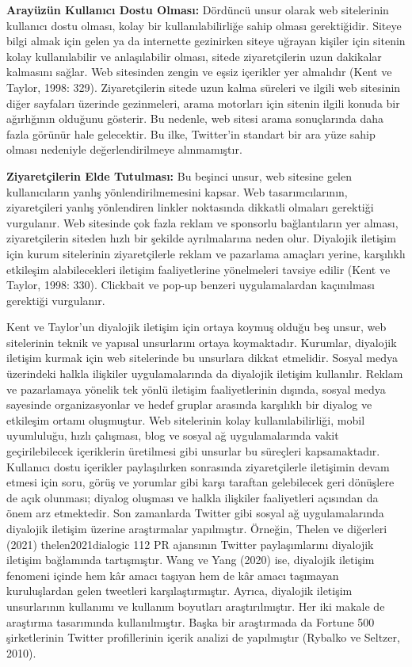 \documentclass[
]{book}
\begin{document}
\textbf{Arayüzün Kullanıcı Dostu Olması:} Dördüncü unsur olarak web sitelerinin kullanıcı dostu olması, kolay bir kullanılabilirliğe sahip olması gerektiğidir. Siteye bilgi almak için gelen ya da internette gezinirken siteye uğrayan kişiler için sitenin kolay kullanılabilir ve anlaşılabilir olması, sitede ziyaretçilerin uzun dakikalar kalmasını sağlar. Web sitesinden zengin ve eşsiz içerikler yer almalıdır (Kent ve Taylor, 1998: 329). Ziyaretçilerin sitede uzun kalma süreleri ve ilgili web sitesinin diğer sayfaları üzerinde gezinmeleri, arama motorları için sitenin ilgili konuda bir ağırlığının olduğunu gösterir. Bu nedenle, web sitesi arama sonuçlarında daha fazla görünür hale gelecektir. Bu ilke, Twitter'in standart bir ara yüze sahip olması nedeniyle değerlendirilmeye alınmamıştır.

\textbf{Ziyaretçilerin Elde Tutulması:} Bu beşinci unsur, web sitesine gelen kullanıcıların yanlış yönlendirilmemesini kapsar. Web tasarımcılarının, ziyaretçileri yanlış yönlendiren linkler noktasında dikkatli olmaları gerektiği vurgulanır. Web sitesinde çok fazla reklam ve sponsorlu bağlantıların yer alması, ziyaretçilerin siteden hızlı bir şekilde ayrılmalarına neden olur. Diyalojik iletişim için kurum sitelerinin ziyaretçilerle reklam ve pazarlama amaçları yerine, karşılıklı etkileşim alabilecekleri iletişim faaliyetlerine yönelmeleri tavsiye edilir (Kent ve Taylor, 1998: 330). Clickbait ve pop-up benzeri uygulamalardan kaçınılması gerektiği vurgulanır.

Kent ve Taylor'un diyalojik iletişim için ortaya koymuş olduğu beş unsur, web sitelerinin teknik ve yapısal unsurlarını ortaya koymaktadır. Kurumlar, diyalojik iletişim kurmak için web sitelerinde bu unsurlara dikkat etmelidir. Sosyal medya üzerindeki halkla ilişkiler uygulamalarında da diyalojik iletişim kullanılır. Reklam ve pazarlamaya yönelik tek yönlü iletişim faaliyetlerinin dışında, sosyal medya sayesinde organizasyonlar ve hedef gruplar arasında karşılıklı bir diyalog ve etkileşim ortamı oluşmuştur. Web sitelerinin kolay kullanılabilirliği, mobil uyumluluğu, hızlı çalışması, blog ve sosyal ağ uygulamalarında vakit geçirilebilecek içeriklerin üretilmesi gibi unsurlar bu süreçleri kapsamaktadır. Kullanıcı dostu içerikler paylaşılırken sonrasında ziyaretçilerle iletişimin devam etmesi için soru, görüş ve yorumlar gibi karşı taraftan gelebilecek geri dönüşlere de açık olunması; diyalog oluşması ve halkla ilişkiler faaliyetleri açısından da önem arz etmektedir.
Son zamanlarda Twitter gibi sosyal ağ uygulamalarında diyalojik iletişim üzerine araştırmalar yapılmıştır. Örneğin, Thelen ve diğerleri (2021) thelen2021dialogic 112 PR ajansının Twitter paylaşımlarını diyalojik iletişim bağlamında tartışmıştır. \citet{wang2020dialogic} Wang ve Yang (2020) ise, diyalojik iletişim fenomeni içinde hem kâr amacı taşıyan hem de kâr amacı taşımayan kuruluşlardan gelen tweetleri karşılaştırmıştır. Ayrıca, diyalojik iletişim unsurlarının kullanımı ve kullanım boyutları araştırılmıştır. Her iki makale de araştırma tasarımında kullanılmıştır. Başka bir araştırmada da Fortune 500 şirketlerinin Twitter profillerinin içerik analizi de yapılmıştır (Rybalko ve Seltzer, 2010).
\end{document}

